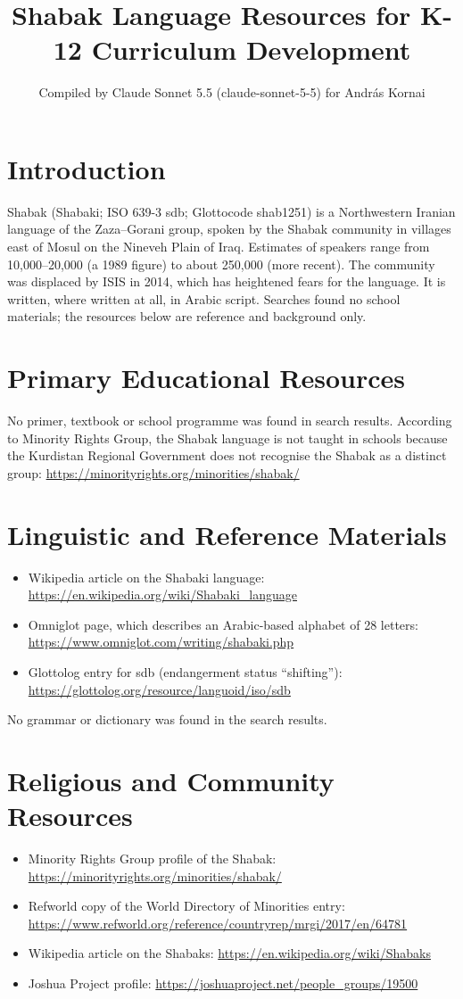 \documentclass[12pt]{article}
\title{Shabak Language Resources for K-12 Curriculum Development}
\author{Compiled by Claude Sonnet 5.5 (claude-sonnet-5-5) for Andr\'as Kornai}
\date{}
\begin{document}
\maketitle

\section{Introduction}
Shabak (Shabaki; ISO 639-3 sdb; Glottocode shab1251) is a Northwestern Iranian language of the Zaza--Gorani group, spoken by the Shabak community in villages east of Mosul on the Nineveh Plain of Iraq. Estimates of speakers range from 10,000--20,000 (a 1989 figure) to about 250,000 (more recent). The community was displaced by ISIS in 2014, which has heightened fears for the language. It is written, where written at all, in Arabic script. Searches found no school materials; the resources below are reference and background only.

\section{Primary Educational Resources}
No primer, textbook or school programme was found in search results. According to Minority Rights Group, the Shabak language is not taught in schools because the Kurdistan Regional Government does not recognise the Shabak as a distinct group:
\url{https://minorityrights.org/minorities/shabak/}

\section{Linguistic and Reference Materials}
\begin{itemize}
\item Wikipedia article on the Shabaki language: \url{https://en.wikipedia.org/wiki/Shabaki_language}
\item Omniglot page, which describes an Arabic-based alphabet of 28 letters: \url{https://www.omniglot.com/writing/shabaki.php}
\item Glottolog entry for sdb (endangerment status ``shifting''): \url{https://glottolog.org/resource/languoid/iso/sdb}
\end{itemize}
No grammar or dictionary was found in the search results.

\section{Religious and Community Resources}
\begin{itemize}
\item Minority Rights Group profile of the Shabak: \url{https://minorityrights.org/minorities/shabak/}
\item Refworld copy of the World Directory of Minorities entry: \url{https://www.refworld.org/reference/countryrep/mrgi/2017/en/64781}
\item Wikipedia article on the Shabaks: \url{https://en.wikipedia.org/wiki/Shabaks}
\item Joshua Project profile: \url{https://joshuaproject.net/people_groups/19500}
\end{itemize}
\end{document}
